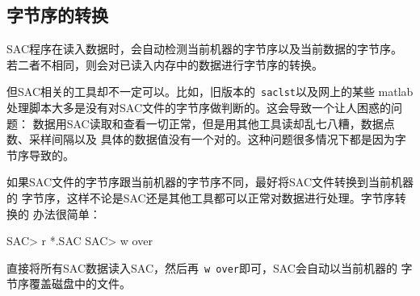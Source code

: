 \subsection{字节序的转换}
SAC程序在读入数据时，会自动检测当前机器的字节序以及当前数据的字节序。
若二者不相同，则会对已读入内存中的数据进行字节序的转换。

但SAC相关的工具却不一定可以。比如，旧版本的~\verb+saclst+以及网上的某些
matlab处理脚本大多是没有对SAC文件的字节序做判断的。这会导致一个让人困惑的问题：
数据用SAC读取和查看一切正常，但是用其他工具读却乱七八糟，数据点数、采样间隔以及
具体的数据值没有一个对的。这种问题很多情况下都是因为字节序导致的。

如果SAC文件的字节序跟当前机器的字节序不同，最好将SAC文件转换到当前机器的
字节序，这样不论是SAC还是其他工具都可以正常对数据进行处理。字节序转换的
办法很简单：
\begin{SACCode}
SAC> r *.SAC
SAC> w over
\end{SACCode}
直接将所有SAC数据读入SAC，然后再~\verb+w over+即可，SAC会自动以当前机器的
字节序覆盖磁盘中的文件。
